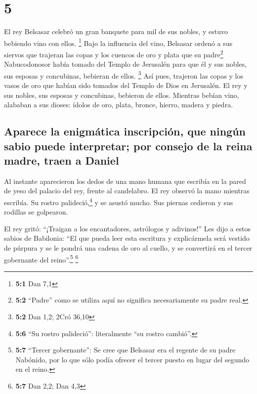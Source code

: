 \hypertarget{section-4}{%
\section{5}\label{section-4}}

 El rey Belsasar celebró un gran banquete para mil de sus
nobles, y estuvo bebiendo vino con ellos. \footnote{\textbf{5:1} Dan 7,1}
 Bajo la influencia del vino, Belsasar ordenó a sus
siervos que trajeran las copas y los cuencos de oro y plata que su
padre\footnote{\textbf{5:2} ``Padre'' como se utiliza aquí no significa
  necesariamente su padre real.} Nabucodonosor había tomado del Templo
de Jerusalén para que él y sus nobles, sus esposas y concubinas,
bebieran de ellos. \footnote{\textbf{5:2} Dan 1,2; 2Cró 36,10}
 Así pues, trajeron las copas y los vasos de oro que
habían sido tomados del Templo de Dios en Jerusalén. El rey y sus
nobles, sus esposas y concubinas, bebieron de ellos. 
Mientras bebían vino, alababan a sus dioses: ídolos de oro, plata,
bronce, hierro, madera y piedra.

\hypertarget{aparece-la-enigmuxe1tica-inscripciuxf3n-que-ninguxfan-sabio-puede-interpretar-por-consejo-de-la-reina-madre-traen-a-daniel}{%
\subsection{Aparece la enigmática inscripción, que ningún sabio puede
interpretar; por consejo de la reina madre, traen a
Daniel}\label{aparece-la-enigmuxe1tica-inscripciuxf3n-que-ninguxfan-sabio-puede-interpretar-por-consejo-de-la-reina-madre-traen-a-daniel}}

 Al instante aparecieron los dedos de una mano humana que
escribía en la pared de yeso del palacio del rey, frente al candelabro.
El rey observó la mano mientras escribía.  Su rostro
palideció,\footnote{\textbf{5:6} ``Su rostro palideció'': literalmente
  ``su rostro cambió''.} y se asustó mucho. Sus piernas cedieron y sus
rodillas se golpearon.

 El rey gritó: ``¡Traigan a los encantadores, astrólogos y
adivinos!'' Les dijo a estos sabios de Babilonia: ``El que pueda leer
esta escritura y explicármela será vestido de púrpura y se le pondrá una
cadena de oro al cuello, y se convertirá en el tercer gobernante del
reino''.\footnote{\textbf{5:7} ``Tercer gobernante'': Se cree que
  Belsasar era el regente de su padre Nabónido, por lo que sólo podía
  ofrecer el tercer puesto en lugar del segundo en el reino.}
\footnote{\textbf{5:7} Dan 2,2; Dan 4,3}

